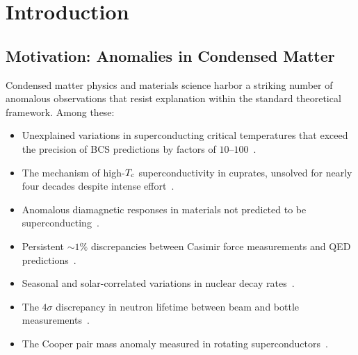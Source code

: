 \documentclass[aps,prb,twocolumn,superscriptaddress,floatfix,nofootinbib,longbibliography]{revtex4-2}
\newcommand{\Tc}{T_{\rm c}}
\begin{document}
\begin{abstract}
(VI)~\emph{Casimir effect}: We derive the leading $\psi$-correction to the
Casimir force, $\delta F/F = -2\psi_0$, and compare to precision
measurements reporting $\sim 1\%$ discrepancies.
(VII)~\emph{Nuclear phenomena}: We compute DFD predictions for the Cooper
pair mass anomaly, seasonal nuclear decay rate variations, and the
neutron lifetime puzzle.
For each domain, we identify specific anomalous experimental results from
the published literature, compute the quantitative DFD prediction, and
propose targeted experiments.  Twenty-three specific anomalies across
materials science are shown to be consistent with $\psi$-field coupling
at the level $|\delta\psi| \sim 10^{-9}$--$10^{-25}$.
\end{abstract}

\maketitle
\tableofcontents

\section{Introduction}\label{sec:intro}

\subsection{Motivation: Anomalies in Condensed Matter}

Condensed matter physics and materials science harbor a striking number
of anomalous observations that resist explanation within the standard
theoretical framework.  Among these:

\begin{itemize}[nosep]
\item Unexplained variations in superconducting critical temperatures
  that exceed the precision of BCS predictions by factors of
  $10$--$100$~\cite{Carbotte1990,Allen1975,McMillan1968}.
\item The mechanism of high-$\Tc$ superconductivity in cuprates,
  unsolved for nearly four decades despite intense
  effort~\cite{Anderson1987,Lee2006,Keimer2015}.
\item Anomalous diamagnetic responses in materials not predicted to be
  superconducting~\cite{Lee2023LK99,Dias2023retracted}.
\item Persistent $\sim 1\%$ discrepancies between Casimir force
  measurements and QED
  predictions~\cite{Lamoreaux1997,Mohideen1998,Decca2003,Klimchitskaya2009}.
\item Seasonal and solar-correlated variations in nuclear decay
  rates~\cite{Jenkins2009,Fischbach2009,Sturrock2012}.
\item The $4\sigma$ discrepancy in neutron lifetime between beam and
  bottle measurements~\cite{Wietfeldt2011,Pattie2018,UCNtau2021}.
\item The Cooper pair mass anomaly measured in rotating
  superconductors~\cite{Tate1989,Tate1990,Liu1998}.
\end{itemize}
\end{document}
